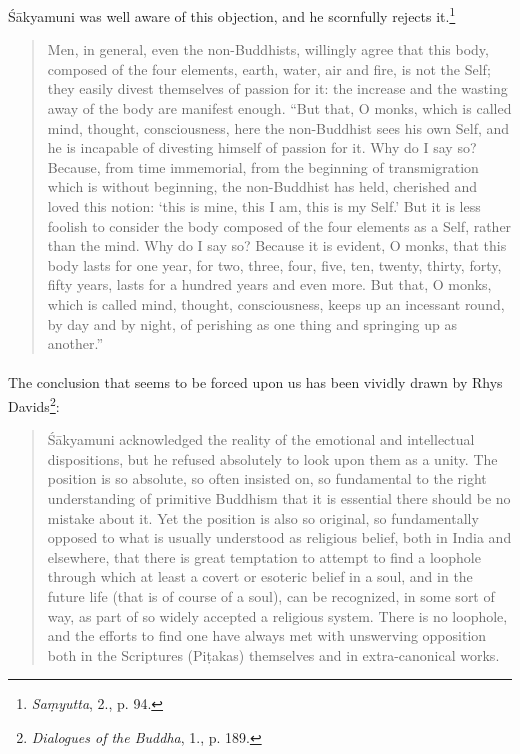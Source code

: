 \documentclass[a4paper, 11pt, oneside, english, landscape]{article}
\begin{document}
Śākyamuni was well aware of this objection, and he scornfully rejects it.\footnote{\emph{Saṃyutta}, 2., p. 94.}
\begin{quotation}
\small
Men, in general, even the non-Buddhists, willingly agree that this body, composed of the four elements, earth, water, air and fire, is not the Self; they easily divest themselves of passion for it: the increase and the wasting away of the body are manifest enough. ``But that, O monks, which is called mind, thought, consciousness, here the non-Buddhist sees his own Self, and he is incapable of divesting himself of passion for it. Why do I say so? Because, from time immemorial, from the beginning of transmigration which is without beginning, the non-Buddhist has held, cherished and loved this notion: `this is mine, this I am, this is my Self.' But it is less foolish to consider the body composed of the four elements as a Self, rather than the mind. Why do I say so? Because it is evident, O monks, that this body lasts for one year, for two, three, four, five, ten, twenty, thirty, forty, fifty years, lasts for a hundred years and even more. But that, O monks, which is called mind, thought, consciousness, keeps up an incessant round, by day and by night, of perishing as one thing and springing up as another.''
\end{quotation}
\paragraph{}
The conclusion that seems to be forced upon us has been vividly drawn by Rhys Davids\footnote{\emph{Dialogues of the Buddha}, 1., p. 189.}:
\begin{quotation}
\small
Śākyamuni acknowledged the reality of the emotional and intellectual dispositions, but he refused absolutely to look upon them as a unity. The position is so absolute, so often insisted on, so fundamental to the right understanding of primitive Buddhism that it is essential there should be no mistake about it. Yet the position is also so original, so fundamentally opposed to what is usually understood as religious belief, both in India and elsewhere, that there is great temptation to attempt to find a loophole through which at least a covert or esoteric belief in a soul, and in the future life (that is of course of a soul), can be recognized, in some sort of way, as part of so widely accepted a religious system. There is no loophole, and the efforts to find one have always met with unswerving opposition both in the Scriptures (Piṭakas) themselves and in extra-canonical works.
\end{quotation}
\end{document}
